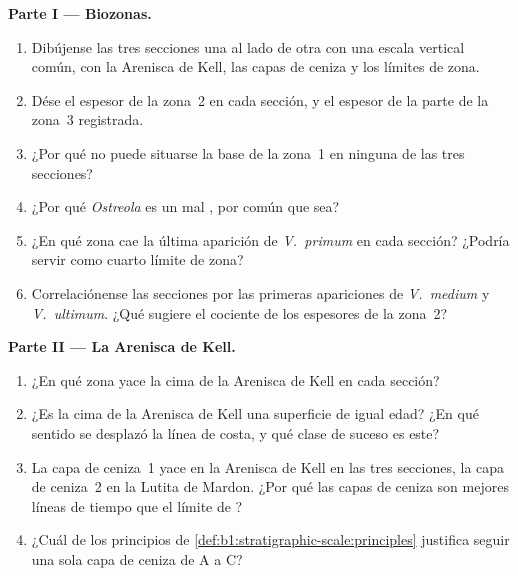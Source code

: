 \begin{problem}
\medskip
\noindent\textbf{Parte I --- Biozonas.}
\begin{enumerate}
  \item Dibújense las tres secciones una al lado de otra con una escala vertical común, con la Arenisca de Kell, las capas de ceniza y los límites de zona.
  \item Dése el espesor de la zona~2 en cada sección, y el espesor de la parte de la zona~3 registrada.
  \item ¿Por qué no puede situarse la base de la zona~1 en ninguna de las tres secciones?
  \item ¿Por qué \emph{Ostreola} es un mal , por común que sea?
  \item ¿En qué zona cae la última aparición de \emph{V.~primum} en cada sección? ¿Podría servir como cuarto límite de zona?
  \item Correlaciónense las secciones por las primeras apariciones de \emph{V.~medium} y \emph{V.~ultimum}. ¿Qué sugiere el cociente de los espesores de la zona~2?
\end{enumerate}

\noindent\textbf{Parte II --- La Arenisca de Kell.}
\begin{enumerate}[resume]
  \item ¿En qué zona yace la cima de la Arenisca de Kell en cada sección?
  \item ¿Es la cima de la Arenisca de Kell una superficie de igual edad? ¿En qué sentido se desplazó la línea de costa, y qué clase de suceso es este?
  \item La capa de ceniza~1 yace en la Arenisca de Kell en las tres secciones, la capa de ceniza~2 en la Lutita de Mardon. ¿Por qué las capas de ceniza son mejores líneas de tiempo que el límite de ?
  \item ¿Cuál de los principios de \cref{def:b1:stratigraphic-scale:principles} justifica seguir una sola capa de ceniza de A a C?
\end{enumerate}


\end{problem}
